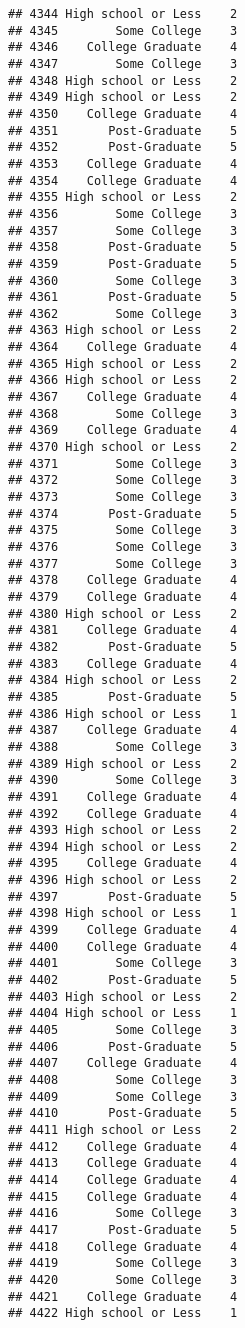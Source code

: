 \documentclass[
]{article}
\begin{document}
\begin{verbatim}
## 4344 High school or Less    2
## 4345        Some College    3
## 4346    College Graduate    4
## 4347        Some College    3
## 4348 High school or Less    2
## 4349 High school or Less    2
## 4350    College Graduate    4
## 4351       Post-Graduate    5
## 4352       Post-Graduate    5
## 4353    College Graduate    4
## 4354    College Graduate    4
## 4355 High school or Less    2
## 4356        Some College    3
## 4357        Some College    3
## 4358       Post-Graduate    5
## 4359       Post-Graduate    5
## 4360        Some College    3
## 4361       Post-Graduate    5
## 4362        Some College    3
## 4363 High school or Less    2
## 4364    College Graduate    4
## 4365 High school or Less    2
## 4366 High school or Less    2
## 4367    College Graduate    4
## 4368        Some College    3
## 4369    College Graduate    4
## 4370 High school or Less    2
## 4371        Some College    3
## 4372        Some College    3
## 4373        Some College    3
## 4374       Post-Graduate    5
## 4375        Some College    3
## 4376        Some College    3
## 4377        Some College    3
## 4378    College Graduate    4
## 4379    College Graduate    4
## 4380 High school or Less    2
## 4381    College Graduate    4
## 4382       Post-Graduate    5
## 4383    College Graduate    4
## 4384 High school or Less    2
## 4385       Post-Graduate    5
## 4386 High school or Less    1
## 4387    College Graduate    4
## 4388        Some College    3
## 4389 High school or Less    2
## 4390        Some College    3
## 4391    College Graduate    4
## 4392    College Graduate    4
## 4393 High school or Less    2
## 4394 High school or Less    2
## 4395    College Graduate    4
## 4396 High school or Less    2
## 4397       Post-Graduate    5
## 4398 High school or Less    1
## 4399    College Graduate    4
## 4400    College Graduate    4
## 4401        Some College    3
## 4402       Post-Graduate    5
## 4403 High school or Less    2
## 4404 High school or Less    1
## 4405        Some College    3
## 4406       Post-Graduate    5
## 4407    College Graduate    4
## 4408        Some College    3
## 4409        Some College    3
## 4410       Post-Graduate    5
## 4411 High school or Less    2
## 4412    College Graduate    4
## 4413    College Graduate    4
## 4414    College Graduate    4
## 4415    College Graduate    4
## 4416        Some College    3
## 4417       Post-Graduate    5
## 4418    College Graduate    4
## 4419        Some College    3
## 4420        Some College    3
## 4421    College Graduate    4
## 4422 High school or Less    1

\end{verbatim}
\end{document}
